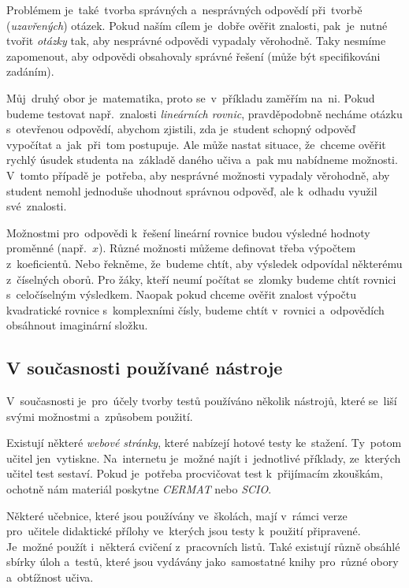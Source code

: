 \documentclass[10pt,a4paper]{article}
\begin{document}
            Problémem je~také~tvorba správných a~nesprávných odpovědí při~tvorbě (\emph{uzavřených}) otázek. Pokud naším cílem je~dobře ověřit znalosti, pak~je~nutné tvořit \emph{otázky} tak, aby nesprávné odpovědi vypadaly věrohodně. Taky nesmíme zapomenout, aby odpovědi obsahovaly správné řešení (může být specifikováni zadáním).

            Můj~druhý obor je~matematika, proto se~v~příkladu zaměřím na~ni. Pokud budeme testovat např.~znalosti \emph{lineárních rovnic}, pravděpodobně necháme otázku s~otevřenou odpovědí, abychom zjistili, zda je~student schopný odpověď vypočítat a~jak~při~tom postupuje. Ale může nastat situace, že~chceme ověřit rychlý úsudek studenta na~základě daného učiva a~pak mu nabídneme možnosti. V~tomto případě je~potřeba, aby nesprávné možnosti vypadaly věrohodně, aby student nemohl jednoduše uhodnout správnou odpověď, ale k~odhadu využil své~znalosti.

            Možnostmi pro~odpovědi k~řešení lineární rovnice budou výsledné hodnoty proměnné (např.~$x$). Různé možnosti můžeme definovat třeba výpočtem z~koeficientů. Nebo řekněme, že~budeme chtít, aby výsledek odpovídal některému z~číselných oborů. Pro žáky, kteří neumí počítat se~zlomky budeme chtít rovnici s~celočíselným výsledkem. Naopak pokud chceme ověřit znalost výpočtu kvadratické rovnice s~komplexními čísly, budeme chtít v~rovnici a~odpovědích obsáhnout imaginární složku. \cite{zhouf:tvorbamatproblemu}

        \subsection{V současnosti používané nástroje}
            V~současnosti je~pro~účely tvorby testů používáno několik nástrojů, které se~liší svými možnostmi a~způsobem použití.
            
            Existují některé \emph{webové stránky}, které nabízejí hotové testy ke~stažení. 
            Ty~potom učitel jen~vytiskne. Na~internetu je~možné najít i~jednotlivé příklady, ze~kterých učitel test sestaví. Pokud je~potřeba procvičovat test k~přijímacím zkouškám, ochotně nám materiál poskytne \emph{CERMAT} nebo \emph{SCIO}.

            Některé učebnice, které jsou používány ve~školách, mají v~rámci verze pro~učitele didaktické přílohy ve~kterých jsou testy k~použití připravené. Je~možné použít i~některá cvičení z~pracovních listů. Také existují různě obsáhlé sbírky úloh a~testů, které jsou vydávány jako~samostatné knihy pro~různé obory a~obtížnost učiva.
\end{document}

